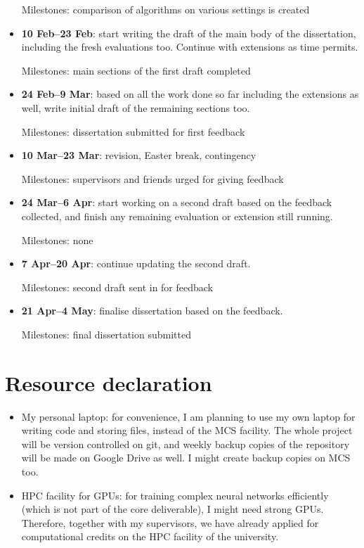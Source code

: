 \begin{itemize}
    Milestones: comparison of algorithms on various settings is created
    \item
    \textbf{10 Feb--23 Feb}: start writing the draft of the main body of the dissertation, including the fresh evaluations too. Continue with extensions as time permits.
    
    Milestones: main sections of the first draft completed
    \item
    \textbf{24 Feb--9 Mar}: based on all the work done so far including the extensions as well, write initial draft of the remaining sections too.
    
    Milestones: dissertation submitted for first feedback
    \item
    \textbf{10 Mar--23 Mar}: revision, Easter break, contingency
    
    Milestones: supervisors and friends urged for giving feedback
    \item
    \textbf{24 Mar--6 Apr}: start working on a second draft based on the feedback collected, and finish any remaining evaluation or extension still running.
    
    Milestones: none
    \item
    \textbf{7 Apr--20 Apr}: continue updating the second draft.
    
    Milestones: second draft sent in for feedback
    \item
    \textbf{21 Apr--4 May}: finalise dissertation based on the feedback.
    
    Milestones: final dissertation submitted
\end{itemize}


\section*{Resource declaration}

\begin{itemize}
    \item
    My personal laptop: for convenience, I am planning to use my own laptop for writing code and storing files, instead of the MCS facility. The whole project will be version controlled on git, and weekly backup copies of the repository will be made on Google Drive as well. I might create backup copies on MCS too.
    \item
    HPC facility for GPUs: for training complex neural networks efficiently (which is not part of the core deliverable), I might need strong GPUs. Therefore, together with my supervisors, we have already applied for computational credits on the HPC facility of the university.
\end{itemize}
